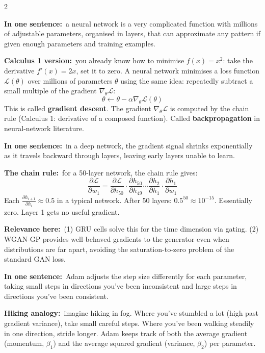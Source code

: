 \documentclass[10pt]{article}
\newcommand{\navybox}[2]{\begin{tcolorbox}[mybox={Navy}{LBg},title={#1}]#2\end{tcolorbox}}
\newcommand{\skybox}[2]{\begin{tcolorbox}[mybox={Sky}{BBg},title={#1}]#2\end{tcolorbox}}
\newcommand{\tealbox}[2]{\begin{tcolorbox}[mybox={Teal}{LBg},title={#1}]#2\end{tcolorbox}}
\begin{document}
\begin{multicols}{2}

\navybox{What is a Neural Network? (Calculus 1 Perspective)}{%
\textbf{In one sentence:}\ a neural network is a very complicated function with millions of adjustable parameters, organised in layers, that can approximate any pattern if given enough parameters and training examples.

\smallskip
\textbf{Calculus 1 version:}\ you already know how to minimise $f(x) = x^2$: take the derivative $f'(x)=2x$, set it to zero. A neural network minimises a loss function $\mathcal{L}(\theta)$ over millions of parameters $\theta$ using the same idea: repeatedly subtract a small multiple of the gradient $\nabla_\theta \mathcal{L}$:
\[\theta \leftarrow \theta - \alpha \nabla_\theta \mathcal{L}(\theta)\]
This is called \textbf{gradient descent}. The gradient $\nabla_\theta \mathcal{L}$ is computed by the chain rule (Calculus 1: derivative of a composed function). Called \textbf{backpropagation} in neural-network literature.}

\skybox{The Vanishing Gradient Problem}{%
\textbf{In one sentence:}\ in a deep network, the gradient signal shrinks exponentially as it travels backward through layers, leaving early layers unable to learn.

\smallskip
\textbf{The chain rule:}\ for a 50-layer network, the chain rule gives:
\[\frac{\partial \mathcal{L}}{\partial w_1} = \frac{\partial \mathcal{L}}{\partial h_{50}} \cdot \frac{\partial h_{50}}{\partial h_{49}} \cdots \frac{\partial h_2}{\partial h_1} \cdot \frac{\partial h_1}{\partial w_1}\]
Each $\frac{\partial h_{i+1}}{\partial h_i} \approx 0.5$ in a typical network. After 50 layers: $0.5^{50} \approx 10^{-15}$. Essentially zero. Layer 1 gets no useful gradient.

\smallskip
\textbf{Relevance here:}\ (1) GRU cells solve this for the time dimension via gating. (2) WGAN-GP provides well-behaved gradients to the generator even when distributions are far apart, avoiding the saturation-to-zero problem of the standard GAN loss.}

\tealbox{Adam: The Smart Optimizer}{%
\textbf{In one sentence:}\ Adam adjusts the step size differently for each parameter, taking small steps in directions you've been inconsistent and large steps in directions you've been consistent.

\smallskip
\textbf{Hiking analogy:}\ imagine hiking in fog. Where you've stumbled a lot (high past gradient variance), take small careful steps. Where you've been walking steadily in one direction, stride longer. Adam keeps track of both the average gradient (momentum, $\beta_1$) and the average squared gradient (variance, $\beta_2$) per parameter.

}
\end{multicols}
\end{document}
